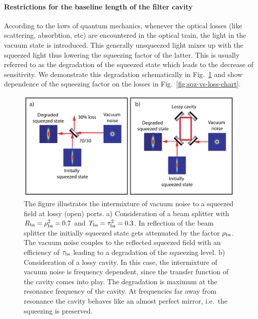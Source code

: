 \paragraph{Restrictions for the baseline length of the filter cavity}
According to the laws of quantum mechanics, whenever the optical losses (like scattering, absorbtion, etc) are encountered in the optical train, the light in the vacuum state is introduced. This generally unsqueezed light mixes up with the squeezed light thus lowering the squeezing factor of the latter. This is usually referred to as the degradation of the squeezed state which leads to the decrease of sensitivity. We demonstrate this degradation schematically in Fig.~\ref{fig:sqz-vs-loss-ill} and show dependence of the squeezing factor on the losses in Fig.~\ref{fig:sqz-vs-loss-chart}.
\begin{figure}[H]
\centering
\includegraphics[scale = .6]{./Sec_Optics/Sqz-vs-loss.pdf}
\caption[Intermixture of vacuum noise to a squeezed field at lossy optics]{The figure illustrates the intermixture of vacuum noise to a squeezed field at lossy (open) ports. a) Consideration of a beam splitter  with {$R_{\rm bs} = \rho_{\rm bs}^2 = 0.7$} and {$T_{\rm bs} = \tau_{\rm bs}^2 = 0.3$}. In reflection of the beam splitter the initially squeezed state gets attenuated by the factor $\rho_{\rm bs}$. The vacuum noise couples to the reflected squeezed field with an efficiency of $\tau_{\rm bs}$ leading to a degradation of the squeezing level. b) Consideration of a lossy cavity. In this case, the intermixture of vacuum noise is frequency dependent, since the transfer function of the cavity comes into play. The degradation is maximum at the resonance frequency of the cavity. At frequencies far away from resonance the cavity behaves like an almost perfect mirror, i.e.\ the squeezing is preserved.} \label{fig:sqz-vs-loss-ill}
\end{figure}
